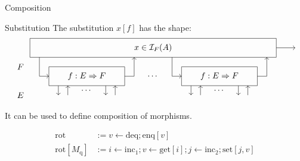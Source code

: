 \documentclass{beamer}
\newcommand{\kw}[1]{\ensuremath{ \mathrm{#1} }}
\begin{document}
\begin{frame}{Composition} %
  \begin{block}{Substitution}
    The substitution $x[f]$ has the shape:
    \[
    \begin{tikzpicture}[scale=0.4]
      \draw[->] (13, 3) -- (15, 3);
      \draw (-13, 2) rectangle (13, 4);
      \node at (0, 3) {$x \in \mathcal{I}_F(A)$};
      \begin{scope}[xshift=-7cm]
        \draw (-4,-1) rectangle (4,1);
        \draw[->] (-5, 2) |- (-4,0);
        \draw[->] (4,0) -| (5,2);
        \node (f) at (0,0) {$f : E \Rightarrow F$};
        \draw[->] (-3, -1) -- (-3, -2);
        \draw[->] (-2, -2) -- (-2, -1);
        \node[below] at (0, -1) {$\cdots$};
        \draw[->] (2, -1) -- (2, -2);
        \draw[->] (3, -2) -- (3, -1);
      \end{scope}
      \node at (0, 0) {$\cdots$};
      \begin{scope}[xshift=7cm]
        \draw (-4,-1) rectangle (4,1);
        \draw[->] (-5, 2) |- (-4,0);
        \draw[->] (4,0) -| (5,2);
        \node (f) at (0,0) {$f : E \Rightarrow F$};
        \draw[->] (-3, -1) -- (-3, -2);
        \draw[->] (-2, -2) -- (-2, -1);
        \node[below] at (0, -1) {$\cdots$};
        \draw[->] (2, -1) -- (2, -2);
        \draw[->] (3, -2) -- (3, -1);
      \end{scope}
      \node at (-14,  1) {$F$};
      \node at (-14, -2) {$E$};
    \end{tikzpicture}
    \]
    It can be used to define composition of morphisms.
  \end{block}
  \pause
  \begin{example}
    \vspace{-3ex}
    \begin{align*}
      \kw{rot} &:=
        v \mathop{\leftarrow} \kw{deq} \mathop{;} \kw{enq}[v] \\
      \kw{rot}[M_\kw{q}] &:=
        i \mathop{\leftarrow} \kw{inc}_1 \mathop{;}
        v \mathop{\leftarrow} \kw{get}[i] \mathop{;}
        j \mathop{\leftarrow} \kw{inc}_2 \mathop{;}
        \kw{set}[j, v]
    \end{align*}
  \end{example}
\end{frame}
\end{document}
